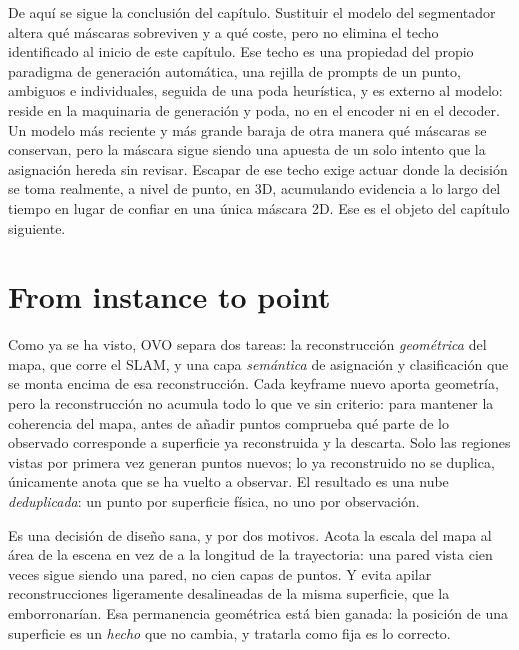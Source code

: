 De aquí se sigue la conclusión del capítulo. Sustituir el modelo del segmentador altera qué
máscaras sobreviven y a qué coste, pero no elimina el techo identificado al inicio de este
capítulo. Ese techo es una propiedad del propio paradigma de generación
automática, una rejilla de prompts de un punto, ambiguos e individuales, seguida de una poda
heurística, y es externo al modelo: reside en la maquinaria de generación y poda, no en el
encoder ni en el decoder. Un modelo más reciente y más grande baraja de otra manera qué
máscaras se conservan, pero la máscara sigue siendo una apuesta de un solo intento que la
asignación hereda sin revisar. Escapar de ese techo exige actuar donde la decisión se toma
realmente, a nivel de punto, en 3D, acumulando evidencia a lo largo del tiempo en lugar de
confiar en una única máscara 2D. Ese es el objeto del capítulo siguiente.


\section{From instance to point}
\label{sec:contest_granularity}

Como ya se ha visto, OVO separa dos tareas: la reconstrucción \emph{geométrica} del
mapa, que corre el SLAM, y una capa \emph{semántica} de asignación y clasificación que se
monta encima de esa reconstrucción. Cada \foreignlanguage{english}{keyframe} nuevo aporta
geometría, pero la reconstrucción no acumula todo lo que ve sin criterio: para mantener la
coherencia del mapa, antes de añadir puntos comprueba qué parte de lo observado
corresponde a superficie ya reconstruida y la descarta. Solo las regiones vistas por
primera vez generan puntos nuevos; lo ya reconstruido no se duplica, únicamente anota que
se ha vuelto a observar. El resultado es una nube \emph{deduplicada}: un punto por
superficie física, no uno por observación.

Es una decisión de diseño sana, y por dos motivos. Acota la escala del mapa al área de la
escena en vez de a la longitud de la trayectoria: una pared vista cien veces sigue siendo
una pared, no cien capas de puntos. Y evita apilar reconstrucciones ligeramente
desalineadas de la misma superficie, que la emborronarían. Esa permanencia geométrica está
bien ganada: la posición de una superficie es un \emph{hecho} que no cambia, y tratarla
como fija es lo correcto.

